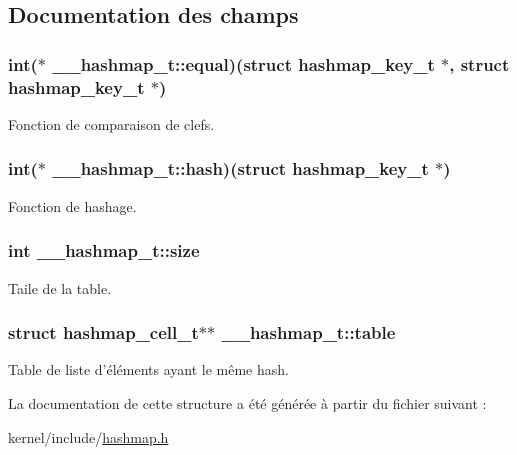 \subsection{Documentation des champs}
\hypertarget{struct____hashmap__t_a2b730301a68342f67a406ce1b6c2a826}{
\subsubsection[{equal}]{\setlength{\rightskip}{0pt plus 5cm}int($\ast$ \-\_\-\-\_\-hashmap\-\_\-t\-::equal)(struct hashmap\-\_\-key\-\_\-t $\ast$, struct hashmap\-\_\-key\-\_\-t $\ast$)}}\label{struct____hashmap__t_a2b730301a68342f67a406ce1b6c2a826}
Fonction de comparaison de clefs. \hypertarget{struct____hashmap__t_aa56e33c3baa182a530a4a8bfc27c11f1}{
\subsubsection[{hash}]{\setlength{\rightskip}{0pt plus 5cm}int($\ast$ \-\_\-\-\_\-hashmap\-\_\-t\-::hash)(struct hashmap\-\_\-key\-\_\-t $\ast$)}}\label{struct____hashmap__t_aa56e33c3baa182a530a4a8bfc27c11f1}
Fonction de hashage. \hypertarget{struct____hashmap__t_ab5f1e74c3fcf71ee4ac91a860cbcde19}{
\subsubsection[{size}]{\setlength{\rightskip}{0pt plus 5cm}int \-\_\-\-\_\-hashmap\-\_\-t\-::size}}\label{struct____hashmap__t_ab5f1e74c3fcf71ee4ac91a860cbcde19}
Taile de la table. \hypertarget{struct____hashmap__t_ac7d3b722978b8bafab2ce2a923b747aa}{
\subsubsection[{table}]{\setlength{\rightskip}{0pt plus 5cm}struct {\bf hashmap\-\_\-cell\-\_\-t}$\ast$$\ast$ \-\_\-\-\_\-hashmap\-\_\-t\-::table}}\label{struct____hashmap__t_ac7d3b722978b8bafab2ce2a923b747aa}
Table de liste d'éléments ayant le même hash. 

La documentation de cette structure a été générée à partir du fichier suivant \-:\begin{DoxyCompactItemize}
\item 
kernel/include/\hyperlink{hashmap_8h}{hashmap.\-h}\end{DoxyCompactItemize}
